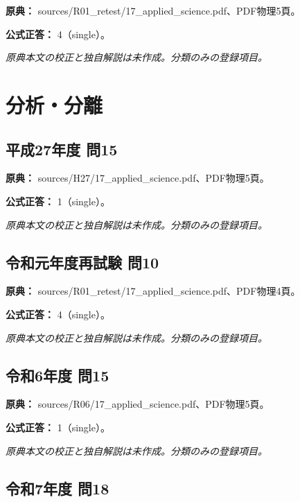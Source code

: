 \noindent\textbf{原典：} sources/R01\_retest/17\_applied\_science.pdf、PDF物理5頁。

\textbf{公式正答：} 4（single）。

\par\textit{原典本文の校正と独自解説は未作成。分類のみの登録項目。}

\section{分析・分離}

\subsection{平成27年度 問15}
\label{q:h27-reg-applied-15}

\noindent\textbf{原典：} sources/H27/17\_applied\_science.pdf、PDF物理5頁。

\textbf{公式正答：} 1（single）。

\par\textit{原典本文の校正と独自解説は未作成。分類のみの登録項目。}

\subsection{令和元年度再試験 問10}
\label{q:r01-ret-applied-10}

\noindent\textbf{原典：} sources/R01\_retest/17\_applied\_science.pdf、PDF物理4頁。

\textbf{公式正答：} 4（single）。

\par\textit{原典本文の校正と独自解説は未作成。分類のみの登録項目。}

\subsection{令和6年度 問15}
\label{q:r06-reg-applied-15}

\noindent\textbf{原典：} sources/R06/17\_applied\_science.pdf、PDF物理5頁。

\textbf{公式正答：} 1（single）。

\par\textit{原典本文の校正と独自解説は未作成。分類のみの登録項目。}

\subsection{令和7年度 問18}
\label{q:r07-reg-applied-18}

